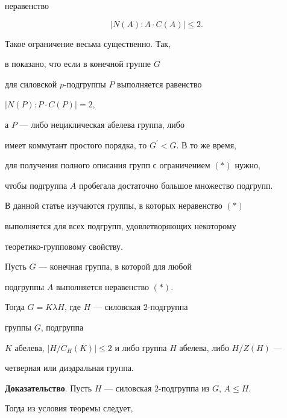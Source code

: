 неравенство


\begin{equation}


|N(A):A \cdot C(A)|\le 2. \tag{$\ast$}


\end{equation}





Такое ограничение весьма существенно. Так,


в \cite{tir} показано, что если в конечной группе $G$


для силовской $p$-подгруппы $P$ выполняется равенство


$|N(P):P \cdot C(P)|=2$,


а $P$ --- либо нециклическая абелева группа, либо


имеет коммутант простого порядка, то $G^\prime <G$. В то же время, 


для получения полного описания групп с ограничением $(\ast)$ нужно,


чтобы подгруппа $A$ пробегала достаточно большое множество подгрупп.





В данной статье изучаются группы, в которых неравенство $(\ast)$


выполняется для всех подгрупп, удовлетворяющих некоторому 


теоретико-групповому свойству.





\begin{thm}


Пусть $G$ --- конечная группа, в которой для любой


подгруппы $A$ выполняется неравенство $(\ast)$.


Тогда $G=K\lambda H$, где $H$ --- силовская $2$-подгруппа 


группы $G$, подгруппа


$K$ абелева, $|H/C_H(K)|\le 2$ и либо группа $H$ абелева, либо $H/Z(H)$ ---


четверная или диэдральная группа.


\end{thm}





{\bf Доказательство}. Пусть $H$ --- силовская 2-подгруппа из $G$, $A\le H$.


Тогда из условия теоремы следует,


